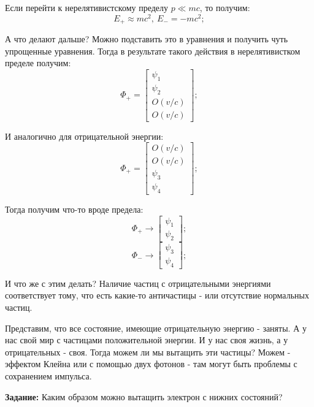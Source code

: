 \documentclass[a4paper, 14pt, russian]{article}
\newcommand{\be}{\begin{equation}}
\newcommand{\ee}{\end{equation}}
\begin{document}
	Если перейти к нерелятивистскому пределу $p \ll mc$, то получим:
	\be
			E_{+} \approx mc^2,~E_{-} = -mc^2;
	\ee

	А что делают дальше? Можно подставить это в уравнения и получить чуть упрощенные уравнения.
	Тогда в результате такого действия в нерелятивистком пределе получим:
	\be
		\Phi_{+} = 
			\begin{bmatrix}
				\psi_1\\
				\psi_2\\
				O(v/c)\\
				O(v/c)
			\end{bmatrix};
	\ee

	И аналогично для отрицательной энергии:
	\be
		\Phi_{+} = 
			\begin{bmatrix}
				O(v/c)\\
				O(v/c)\\
				\psi_3\\
				\psi_4
			\end{bmatrix};
	\ee

	Тогда получим что-то вроде предела:
	\be
		\Phi_{+} \rightarrow \begin{bmatrix} \psi_1\\ \psi_2\end{bmatrix};
	\ee
	\be
		\Phi_{-} \rightarrow \begin{bmatrix} \psi_3\\ \psi_4\end{bmatrix};
	\ee

	И что же с этим делать? Наличие частиц с отрицательными энергиями соответствует тому,
	что есть какие-то античастицы - или отсутствие нормальных частиц.

	Представим, что все состояние, имеющие отрицательную энергию - заняты. А у нас свой 
	мир с частицами положительной энергии. И у нас своя жизнь, а у отрицательных - своя.
	Тогда можем ли мы вытащить эти частицы? Можем - эффектом Клейна или с помощью двух 
	фотонов - там могут быть проблемы с сохранением импульса.

	\begin{tcolorbox}
		\textbf{Задание:} Каким образом можно вытащить электрон с нижних состояний?
	\end{tcolorbox}
\end{document}
